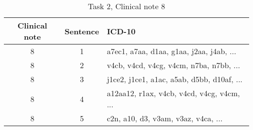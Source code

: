 \begin{table}[htbp] \footnotesize \center
\caption{Task 2, Clinical note 8 \label{tab:t2c8}}
\begin{tabularx}{\textwidth}{c c X}
    \toprule
    Clinical note & Sentence & ICD-10 \\
    \midrule
	 8 & 1 & a7ec1, a7aa, d1aa, g1aa, j2aa, j4ab, ... \\
	 8 & 2 & v4cb, v4cd, v4cg, v4cm, n7ba, n7bb, ... \\
	 8 & 3 & j1ce2, j1ce1, a1ac, a5ab, d5bb, d10af, ... \\
	 8 & 4 & a12aa12, r1ax, v4cb, v4cd, v4cg, v4cm, ... \\
	 8 & 5 & c2n, a10, d3, v3am, v3az, v4ca, ... \\
	\bottomrule
\end{tabularx}
\end{table}